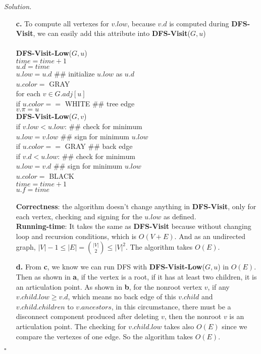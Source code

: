 \documentclass[11pt]{article}
\theoremstyle{definition}
\newenvironment{solution}{\noindent\emph{Solution.}}{\hfill$\square$}
\newcommand\tab[1][1cm]{\hspace*{#1}}
\begin{document}
\begin{solution}
\begin{enumerate}
  \item[\textbf{c.}] \tab To compute all vertexes for $v.low$, because $v.d$ is computed during  \textbf{DFS-Visit}, we can easily add this attribute into \textbf{DFS-Visit}($G, u$)\\
  \\
  \textbf{DFS-Visit-Low}($G,u$)\\
  $time = time + 1$\\
  $u.d = time $\\
  $u.low = u.d$ \tab\tab\tab \#\# initialize $u.low$ as $u.d$\\
  $u.color = $ GRAY\\
  for each $v \in G.adj[u]$\\
  \tab if $u.color ==$ WHITE \tab\tab\tab \#\# tree edge\\
  \tab \tab $v. \pi = u$\\
  \tab \tab  \textbf{DFS-Visit-Low}($G,v$)\\
  \tab \tab if $v.low < u.low$: \tab\tab\tab \#\# check for minimum\\
  \tab \tab \tab $u.low = v.low$ \tab\tab\tab \#\# sign for minimum $u.low$\\
  \tab if $u.color ==$ GRAY \tab\tab\tab \#\# back edge\\
    \tab \tab if $v.d < u.low$: \tab\tab\tab \#\# check for minimum\\
      \tab \tab \tab $u.low = v.d$ \tab\tab\tab \#\# sign for minimum $u.low$\\
  $u.color = $ BLACK\\
  $time = time + 1$\\
  $u.f = time$\\
  \\
  \tab \textbf{Correctness}: the algorithm doesn't change anything in \textbf{DFS-Visit}, only for each vertex, checking and signing for the $u.low$ as defined.\\
  \tab \textbf{Running-time}: It takes the same as \textbf{DFS-Visit} because without changing loop and recursion conditions, which is $O(V+E)$. And as an undirected graph, $\vert V \vert - 1 \leq  \vert E \vert  = \binom {\vert V \vert}{2} \leq \vert V \vert ^2 $. The algorithm takes $O(E)$.
  
  
  \item[\textbf{d.}]  \tab From \textbf{c}, we know we can run DFS with \textbf{DFS-Visit-Low}($G,u$) in $O(E)$. Then as shown in \textbf{a}, if the vertex is a root, if it has at least two children, it is an articulation point. As shown in \textbf{b}, for the nonroot vertex $v$, if any $v.child.low \geq v.d$, which means no back edge of this $v.child$ and $v.child.children$ to $v.ancestors$, in this circumstance, there must be a disconnect component produced after deleting $v$, then the nonroot $v$ is an articulation point. The checking for $v.child.low$ takes also $O(E)$ since we compare the vertexes of one edge. So the algorithm takes $O(E)$.
  

\end{enumerate}
\end{solution}
\end{document}
